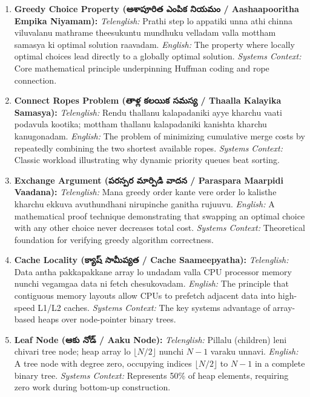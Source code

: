 \documentclass[10pt,twocolumn,letterpaper]{article}
\begin{document}
\begin{enumerate}
    \item \textbf{Greedy Choice Property (ఆశాపూరిత ఎంపిక నియమం / Aashaapooritha Empika Niyamam):}
    \textit{Telenglish:} Prathi step lo appatiki unna athi chinna viluvalanu mathrame theesukuntu mundhuku velladam valla mottham samasya ki optimal solution raavadam.
    \textit{English:} The property where locally optimal choices lead directly to a globally optimal solution.
    \textit{Systems Context:} Core mathematical principle underpinning Huffman coding and rope connection.

    \item \textbf{Connect Ropes Problem (తాళ్ల కలయిక సమస్య / Thaalla Kalayika Samasya):}
    \textit{Telenglish:} Rendu thallanu kalapadaniki ayye kharchu vaati podavula kootika; mottham thallanu kalapadaniki kanishta kharchu kanugonadam.
    \textit{English:} The problem of minimizing cumulative merge costs by repeatedly combining the two shortest available ropes.
    \textit{Systems Context:} Classic workload illustrating why dynamic priority queues beat sorting.

    \item \textbf{Exchange Argument (పరస్పర మార్పిడి వాదన / Paraspara Maarpidi Vaadana):}
    \textit{Telenglish:} Mana greedy order kante vere order lo kalisthe kharchu ekkuva avuthundhani nirupinche ganitha rujuuvu.
    \textit{English:} A mathematical proof technique demonstrating that swapping an optimal choice with any other choice never decreases total cost.
    \textit{Systems Context:} Theoretical foundation for verifying greedy algorithm correctness.

    \item \textbf{Cache Locality (క్యాష్ సామీప్యత / Cache Saameepyatha):}
    \textit{Telenglish:} Data antha pakkapakkane array lo undadam valla CPU processor memory nunchi vegamgaa data ni fetch chesukovadam.
    \textit{English:} The principle that contiguous memory layouts allow CPUs to prefetch adjacent data into high-speed L1/L2 caches.
    \textit{Systems Context:} The key systems advantage of array-based heaps over node-pointer binary trees.

    \item \textbf{Leaf Node (ఆకు నోడ్ / Aaku Node):}
    \textit{Telenglish:} Pillalu (children) leni chivari tree node; heap array lo $\lfloor N/2 \rfloor$ nunchi $N-1$ varaku unnavi.
    \textit{English:} A tree node with degree zero, occupying indices $\lfloor N/2 \rfloor$ to $N-1$ in a complete binary tree.
    \textit{Systems Context:} Represents 50\% of heap elements, requiring zero work during bottom-up construction.


\end{enumerate}
\end{document}
